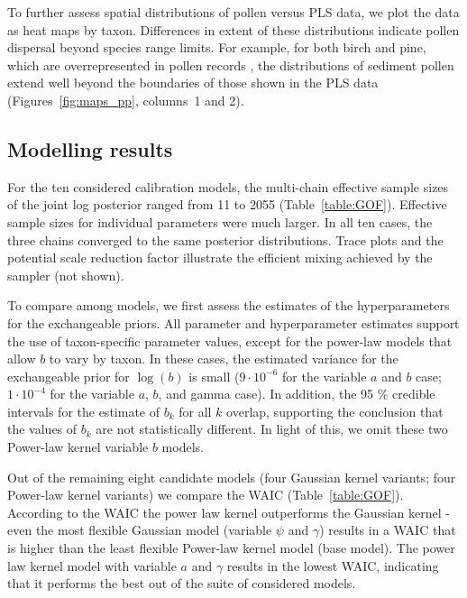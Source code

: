 \documentclass[12pt]{article}
\begin{document}
To further assess spatial distributions of pollen versus PLS data, we
plot the data as heat maps by taxon. Differences in extent of these
distributions indicate pollen dispersal beyond species range
limits. For example, for both birch and pine, which are
overrepresented in pollen records \citep{webb1981estimating,
  bradshaw1985relationships, jackson1990, williams2003palynological},
the distributions of sediment pollen extend well beyond the boundaries
of those shown in the PLS data (Figures~\ref{fig:maps_pp}, columns~1
and 2).

\subsection{Modelling results}

For the ten considered calibration models, the multi-chain effective
sample sizes of the joint log posterior ranged from 11 to 2055
(Table~\ref{table:GOF}). Effective sample sizes for individual
parameters were much larger. In all ten cases, the three chains
converged to the same posterior distributions. Trace plots and the
potential scale reduction factor illustrate the efficient mixing
achieved by the sampler (not shown).

To compare among models, we first assess the estimates of the
hyperparameters for the exchangeable priors. All parameter and
hyperparameter estimates support the use of taxon-specific parameter
values, except for the power-law models that allow $b$ to vary by
taxon. In these cases, the estimated variance for the exchangeable
prior for $\log ( b )$ is small ($9\cdot 10^{-6}$ for the variable $a$
and $b$ case; $1\cdot 10^{-4}$ for the variable $a$, $b$, and gamma
case). In addition, the 95 \% credible intervals for the estimate of
$b_k$ for all $k$ overlap, supporting the conclusion that the values
of $b_k$ are not statistically different. In light of this, we omit
these two Power-law kernel variable $b$ models.

Out of the remaining eight candidate models (four Gaussian kernel
variants; four Power-law kernel variants) we compare the WAIC
(Table~\ref{table:GOF}). According to the WAIC the power law kernel
outperforms the Gaussian kernel - even the most flexible Gaussian
model (variable $\psi$ and $\gamma$) results in a WAIC that is higher
than the least flexible Power-law kernel model (base model). The power
law kernel model with variable $a$ and $\gamma$ results in the lowest
WAIC, indicating that it performs the best out of the suite of
considered models. 
\end{document}

